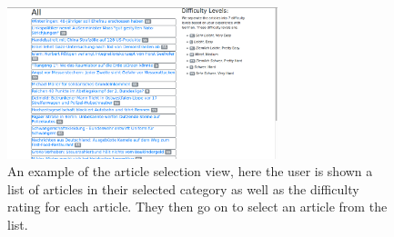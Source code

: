 \begin{figure}
	\caption[Screenshot of the Article Selection View]{An example of the article selection view, here the user is shown a list of articles in their selected category as well as the difficulty rating for each article. They then go on to select an article from the list.}
	\label{fig:view2}
	\begin{center}
	\includegraphics[width=0.7\textwidth]{Graphics/View2}
\end{center}
\end{figure}